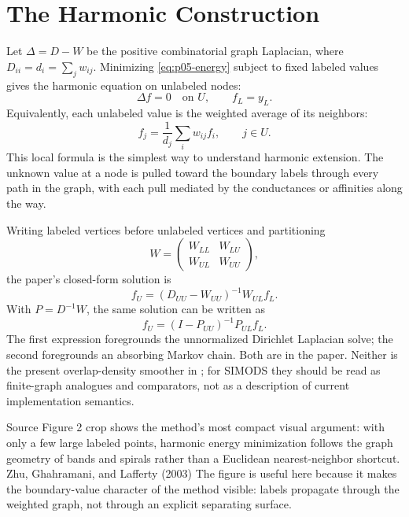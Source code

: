 \documentclass[11pt]{article}
\begin{document}
\section{The Harmonic Construction}

Let \(\Delta=D-W\) be the positive combinatorial graph Laplacian, where
\(D_{ii}=d_i=\sum_j w_{ij}\). Minimizing \eqref{eq:p05-energy} subject to fixed
labeled values gives the harmonic equation on unlabeled nodes:
\begin{equation}
  \Delta f = 0 \quad \text{on } U,
  \qquad
  f_L=y_L.
\end{equation}
Equivalently, each unlabeled value is the weighted average of its neighbors:
\begin{equation}
  f_j=\frac{1}{d_j}\sum_i w_{ij}f_i,
  \qquad j\in U.
  \label{eq:p05-harmonic-average}
\end{equation}
This local formula is the simplest way to understand harmonic extension. The
unknown value at a node is pulled toward the boundary labels through every path
in the graph, with each pull mediated by the conductances or affinities along
the way.

Writing labeled vertices before unlabeled vertices and partitioning
\[
W=
\begin{pmatrix}
W_{LL} & W_{LU}\\
W_{UL} & W_{UU}
\end{pmatrix},
\]
the paper's closed-form solution is
\begin{equation}
  f_U = (D_{UU}-W_{UU})^{-1}W_{UL}f_L.
  \label{eq:p05-dirichlet-solve}
\end{equation}
With \(P=D^{-1}W\), the same solution can be written as
\[
  f_U=(I-P_{UU})^{-1}P_{UL}f_L.
\]
The first expression foregrounds the unnormalized Dirichlet Laplacian solve; the
second foregrounds an absorbing Markov chain. Both are in the paper. Neither is
the present overlap-density smoother in ; for SIMODS they should be
read as finite-graph analogues and comparators, not as a description of current
implementation semantics.

{Source Figure 2 crop shows the method's most compact visual argument:
with only a few large labeled points, harmonic energy minimization follows the
graph geometry of bands and spirals rather than a Euclidean nearest-neighbor
shortcut.}
{Zhu, Ghahramani, and Lafferty (2003)}
{The figure is useful here because it makes the boundary-value character of the
method visible: labels propagate through the weighted graph, not through an
explicit separating surface.}
\end{document}
